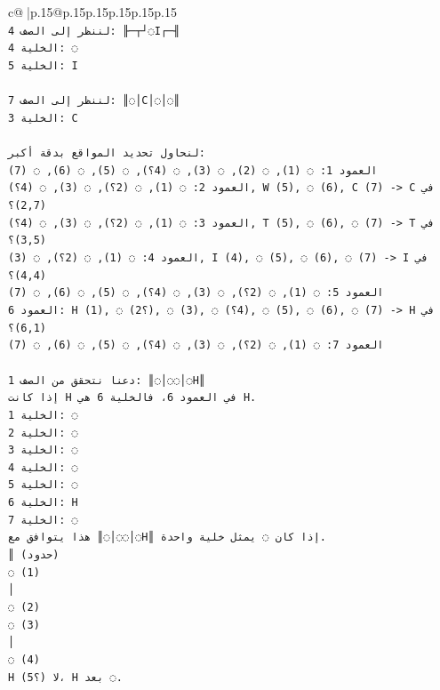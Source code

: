 \documentclass{article}
\begin{document}
{\begin{supertabular}{c@{$\;$}|p{.15\linewidth}@{}p{.15\linewidth}p{.15\linewidth}p{.15\linewidth}p{.15\linewidth}p{.15\linewidth}}
{{{\\ 
\texttt{لننظر إلى الصف 4: ╟─┬┘◌I┌─╢} \\
\texttt{الخلية 4: ◌} \\
\texttt{الخلية 5: I} \\
\\ 
\texttt{لننظر إلى الصف 7: ║◌│C│◌│◌║} \\
\texttt{الخلية 3: C} \\
\\ 
\texttt{لنحاول تحديد المواقع بدقة أكبر:} \\
\texttt{العمود 1: ◌ (1), ◌ (2), ◌ (3), ◌ (4؟), ◌ (5), ◌ (6), ◌ (7)} \\
\texttt{العمود 2: ◌ (1), ◌ (2؟), ◌ (3), ◌ (4؟), W (5), ◌ (6), C (7) {-}> C في (2,7)؟} \\
\texttt{العمود 3: ◌ (1), ◌ (2؟), ◌ (3), ◌ (4؟), T (5), ◌ (6), ◌ (7) {-}> T في (3,5)؟} \\
\texttt{العمود 4: ◌ (1), ◌ (2؟), ◌ (3), I (4), ◌ (5), ◌ (6), ◌ (7) {-}> I في (4,4)؟} \\
\texttt{العمود 5: ◌ (1), ◌ (2؟), ◌ (3), ◌ (4؟), ◌ (5), ◌ (6), ◌ (7)} \\
\texttt{العمود 6: H (1), ◌ (2؟), ◌ (3), ◌ (4؟), ◌ (5), ◌ (6), ◌ (7) {-}> H في (6,1)؟} \\
\texttt{العمود 7: ◌ (1), ◌ (2؟), ◌ (3), ◌ (4؟), ◌ (5), ◌ (6), ◌ (7)} \\
\\ 
\texttt{دعنا نتحقق من الصف 1: ║◌│◌◌│◌H║} \\
\texttt{إذا كانت H في العمود 6، فالخلية 6 هي H.} \\
\texttt{الخلية 1: ◌} \\
\texttt{الخلية 2: ◌} \\
\texttt{الخلية 3: ◌} \\
\texttt{الخلية 4: ◌} \\
\texttt{الخلية 5: ◌} \\
\texttt{الخلية 6: H} \\
\texttt{الخلية 7: ◌} \\
\texttt{هذا يتوافق مع ║◌│◌◌│◌H║ إذا كان ◌ يمثل خلية واحدة.} \\
\texttt{║ (حدود)} \\
\texttt{◌ (1)} \\
\texttt{│} \\
\texttt{◌ (2)} \\
\texttt{◌ (3)} \\
\texttt{│} \\
\texttt{◌ (4)} \\
\texttt{H (5؟) لا، H بعد ◌.} \\
}}}
\end{supertabular}}
\end{document}
